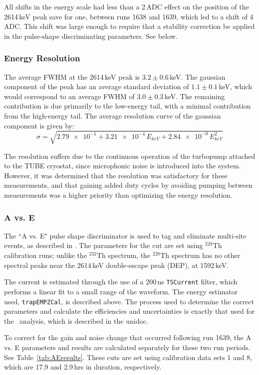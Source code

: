 \documentclass[groupedaddress,rmp,amsmath,amssymb,bibnotes,altaffilletter,twocolumn]{revtex4-1}
\begin{document}
All shifts in the energy scale had less than a 2\,ADC effect on the position of the 2614\,keV peak save for one, between runs 1638 and 1639, which led to a shift of 4\,ADC. This shift was large enough to require that a stability correction be applied in the pulse-shape discriminating parameters. See below. 

\subsubsection{Energy Resolution}
The average FWHM at the 2614\,keV peak is $3.2\pm0.6$\,keV. The gaussian component of the peak has an average standard deviation of $1.1\pm0.1$\,keV, which would correspond to an average FWHM of $3.0\pm0.3$\,keV. The remaining contribution is due primarily to the low-energy tail, with a minimal contribution from the high-energy tail. The average resolution curve of the gaussian component is given by:
$$\sigma = \sqrt{\num{2.79e-1}+\num{3.21e-4}\,E_{keV}+\num{2.84e-9}\,E_{keV}^2}$$

The resolution suffers due to the continuous operation of the turbopump attached to the TUBE cryostat, since microphonic noise is introduced into the system. However, it was determined that the resolution was satisfactory for these measurements, and that gaining added duty cycles by avoiding pumping between measurements was a higher priority than optimizing the energy resolution. 

\subsubsection{A vs. E}
The ``A vs. E" pulse shape discriminator is used to tag and eliminate multi-site events, as described in \cite{AvsE_unidoc}. The parameters for the cut are set using $^{228}$Th calibration runs; unlike the $^{232}$Th spectrum, the $^{228}$Th spectrum has no other spectral peaks near the 2614\,keV double-escape peak (DEP), at 1592\,keV.

The current is estimated through the use of a 200\,ns {\tt TSCurrent} filter, which performs a linear fit to a small range of the waveform. The energy estimator used, {\tt trapEMPZCal}, is described above. The process used to determine the correct parameters and calculate the efficiencies and uncertainties is exactly that used for the \MJ\ analysis, which is described in the unidoc. 

To correct for the gain and noise change that occurred following run 1639, the A vs. E parameters and results are calculated separately for these two run periods. See Table~\ref{tab:AEresults}. These cuts are set using calibration data sets 1 and 8, which are 17.9 and 2.9\,hrs in duration, respectively. 
\end{document}
